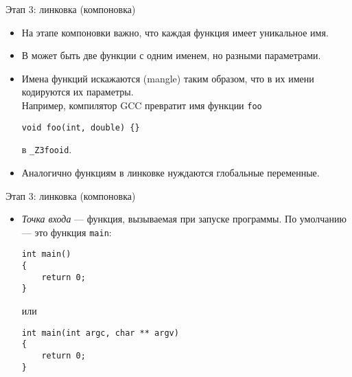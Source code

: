 \documentclass{beamer}
\begin{document}
\begin{frame}[fragile]{Этап 3: линковка (компоновка)}
\begin{itemize}
    \item На этапе компоновки важно, что каждая функция имеет уникальное имя.

    \item В \langcpp может быть две функции с одним именем, но разными
        параметрами.

    \item Имена функций искажаются (mangle) таким образом, что в их имени
        кодируются их параметры.\\
Например, компилятор GCC превратит имя функции \verb!foo!
\begin{lstlisting}
void foo(int, double) {}
\end{lstlisting}
в \verb!_Z3fooid!.

\item Аналогично функциям в линковке нуждаются глобальные переменные.

%
%
\end{itemize}
\end{frame}

\begin{frame}[fragile]{Этап 3: линковка (компоновка)}
\begin{itemize}
    \item \emph{Точка входа} — функция, вызываемая при запуске программы.
        По умолчанию — это функция \verb!main!:
\begin{lstlisting}
int main()
{
    return 0;
}
\end{lstlisting}
или
\begin{lstlisting}
int main(int argc, char ** argv)
{
    return 0;
}
\end{lstlisting}
\end{itemize}
\end{frame}
\end{document}
